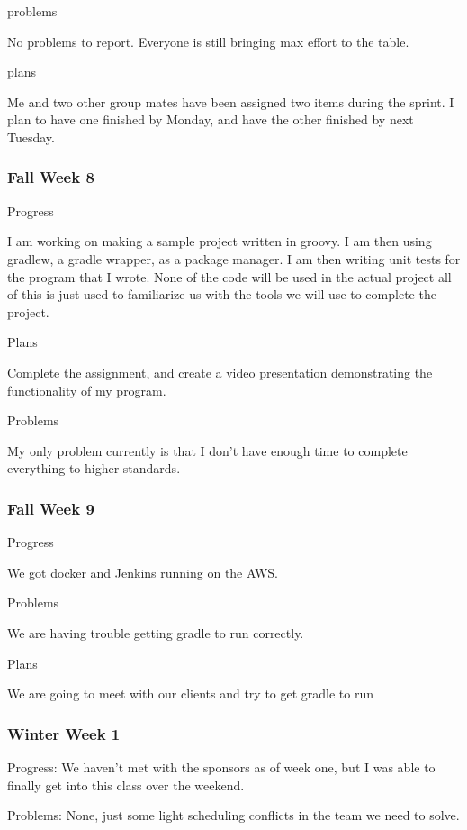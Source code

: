 \documentclass[onecolumn, draftclsnofoot,10pt, compsoc]{IEEEtran}
\begin{document}
problems

No problems to report. Everyone is still bringing max effort to the table.

plans

Me and two other group mates have been assigned two items during the sprint. I plan to have one finished by Monday, and have the other finished by next Tuesday.

\subsubsection*{Fall Week 8}

Progress

I am working on making a sample project written in groovy. I am then using gradlew, a gradle wrapper, as a package manager. I am then writing unit tests for the program that I wrote. None of the code will be used in the actual project all of this is just used to familiarize us with the tools we will use to complete the project.

Plans

Complete the assignment, and create a video presentation demonstrating the functionality of my program.

Problems

My only problem currently is that I don't have enough time to complete everything to higher standards.

\subsubsection*{Fall Week 9}

Progress

We got docker and Jenkins running on the AWS.

Problems

We are having trouble getting gradle to run correctly.

Plans

We are going to meet with our clients and try to get gradle to run

\subsubsection*{Winter Week 1}

Progress: We haven't met with the sponsors as of week one, but I was able to finally get into this class over the weekend.

Problems: None, just some light scheduling conflicts in the team we need to solve.
\end{document}
